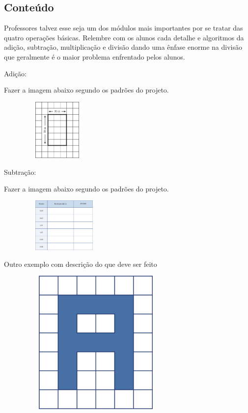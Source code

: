 \subsection{Conteúdo}\label{conteuxfado-1}

\protect\hypertarget{_Hlk128407586}{}{}Professores talvez esse seja um
dos módulos mais importantes por se tratar das quatro operações básicas.
Relembre com os alunos cada detalhe e algoritmos da adição, subtração,
multiplicação e divisão dando uma ênfase enorme na divisão que
geralmente é o maior problema enfrentado pelos alunos.

Adição:

Fazer a imagem abaixo segundo os padrões do projeto.

\includegraphics[width=2.26282in,height=1.19473in]{media/image27.png}

Subtração:

Fazer a imagem abaixo segundo os padrões do projeto.

\includegraphics[width=2.55128in,height=1.04961in]{media/image28.png}

Outro exemplo com descrição do que deve ser feito

\includegraphics[width=3.89200in,height=2.81691in]{media/image29.png}

